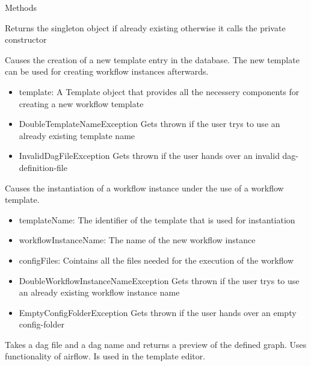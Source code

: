 \begin{methodenv}{Methods}

Returns the singleton object if already existing otherwise it calls the private constructor

Causes the creation of a new template entry in the database. The new template can be used for creating workflow instances afterwards.

\begin{itemize}
	\item{template:}
	A Template object that provides all the necessery components for creating a new workflow template
\end{itemize}

\begin{itemize}
	\item{DoubleTemplateNameException}
	Gets thrown if the user trys to use an already existing template name
	\item{InvalidDagFileException}
	Gets thrown if the user hands over an invalid dag-definition-file
\end{itemize}

Causes the instantiation of a workflow instance under the use of a workflow template. 

\begin{itemize}
	\item{templateName:}
	The identifier of the template that is used for instantiation
	\item{workflowInstanceName:}
	The name of the new workflow instance
	\item{configFiles:}
	Cointains all the files needed for the execution of the workflow
\end{itemize}

\begin{itemize}
	\item{DoubleWorkflowInstanceNameException}
	Gets thrown if the user trys to use an already existing workflow instance name
	\item{EmptyConfigFolderException}
	Gets thrown if the user hands over an empty config-folder
\end{itemize}

Takes a dag file and a dag name and returns a preview of the defined graph. Uses functionality of airflow. Is used in the template editor.


\end{methodenv}
